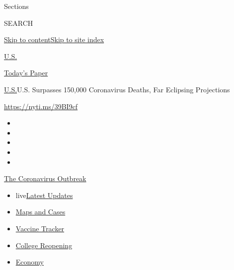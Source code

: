Sections

SEARCH

\protect\hyperlink{site-content}{Skip to
content}\protect\hyperlink{site-index}{Skip to site index}

\href{https://www.nytimes3xbfgragh.onion/section/us}{U.S.}

\href{https://myaccount.nytimes3xbfgragh.onion/auth/login?response_type=cookie\&client_id=vi}{}

\href{https://www.nytimes3xbfgragh.onion/section/todayspaper}{Today's
Paper}

\href{/section/us}{U.S.}\textbar{}U.S. Surpasses 150,000 Coronavirus
Deaths, Far Eclipsing Projections

\url{https://nyti.ms/39BI9cf}

\begin{itemize}
\item
\item
\item
\item
\item
\end{itemize}

\href{https://www.nytimes3xbfgragh.onion/news-event/coronavirus?action=click\&pgtype=Article\&state=default\&region=TOP_BANNER\&context=storylines_menu}{The
Coronavirus Outbreak}

\begin{itemize}
\tightlist
\item
  live\href{https://www.nytimes3xbfgragh.onion/2020/08/04/world/coronavirus-cases.html?action=click\&pgtype=Article\&state=default\&region=TOP_BANNER\&context=storylines_menu}{Latest
  Updates}
\item
  \href{https://www.nytimes3xbfgragh.onion/interactive/2020/us/coronavirus-us-cases.html?action=click\&pgtype=Article\&state=default\&region=TOP_BANNER\&context=storylines_menu}{Maps
  and Cases}
\item
  \href{https://www.nytimes3xbfgragh.onion/interactive/2020/science/coronavirus-vaccine-tracker.html?action=click\&pgtype=Article\&state=default\&region=TOP_BANNER\&context=storylines_menu}{Vaccine
  Tracker}
\item
  \href{https://www.nytimes3xbfgragh.onion/2020/08/02/us/covid-college-reopening.html?action=click\&pgtype=Article\&state=default\&region=TOP_BANNER\&context=storylines_menu}{College
  Reopening}
\item
  \href{https://www.nytimes3xbfgragh.onion/live/2020/08/04/business/stock-market-today-coronavirus?action=click\&pgtype=Article\&state=default\&region=TOP_BANNER\&context=storylines_menu}{Economy}
\end{itemize}

